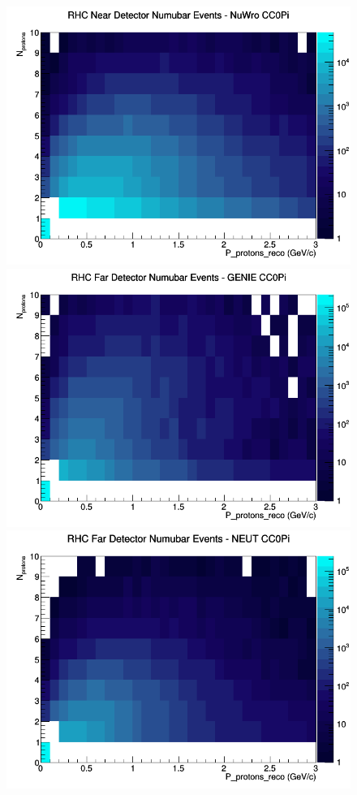 \begin{figure}[h]
\includegraphics[width=\linewidth]{eff_N_P/LAr/protons/CC0Pi_RHC_ND_numubar_N_P_NuWro.png}
\endminipage
\newline
{}
\includegraphics[width=\linewidth]{eff_N_P/LAr/protons/CC0Pi_RHC_FD_numubar_N_P_GENIE.png}
\endminipage
{}
\includegraphics[width=\linewidth]{eff_N_P/LAr/protons/CC0Pi_RHC_FD_numubar_N_P_NEUT.png}

\end{figure}
